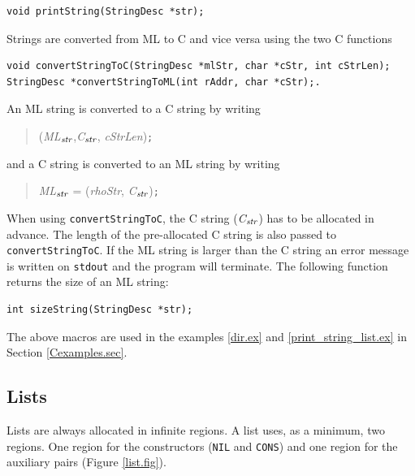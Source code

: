 \documentclass[12pt]{book}
\begin{document}
\begin{verbatim}
void printString(StringDesc *str);
\end{verbatim}

Strings are converted from ML to C and vice versa using the two C 
functions

\begin{verbatim}
void convertStringToC(StringDesc *mlStr, char *cStr, int cStrLen);
StringDesc *convertStringToML(int rAddr, char *cStr);.
\end{verbatim}
\noindent
An ML string is converted to a C string by writing
\begin{quote}
(\emph{ML}$_{\emph{str}}$,\emph{C}$_{\emph{str}}$, \emph{cStrLen})\texttt{;}
\end{quote}
\noindent
and a C string is converted to an ML string by writing
\begin{quote}
\emph{ML}$_{\emph{str}}$ = (\emph{rhoStr}, \emph{C}$_{\emph{str}}$)\texttt{;}
\end{quote}

When using \texttt{convertStringToC}, the C string
(\emph{C}$_{\emph{str}}$) has to be allocated in advance. The length
of the pre-allocated C string is also passed to
\texttt{convertStringToC}. If the ML string is larger than the C
string an error message is written on {\tt stdout} and the program
will terminate. The following function returns the size of an ML
string:
\begin{verbatim}
int sizeString(StringDesc *str);
\end{verbatim}

The above macros are used in the examples \ref{dir.ex} and
\ref{print_string_list.ex} in Section \ref{Cexamples.sec}.

\subsection{Lists}

Lists are always allocated in infinite regions. A list uses, as a minimum,
two regions. One region for the constructors (\texttt{NIL} and
\texttt{CONS}) and one region for the auxiliary pairs (Figure \ref{list.fig}).
\end{document}
